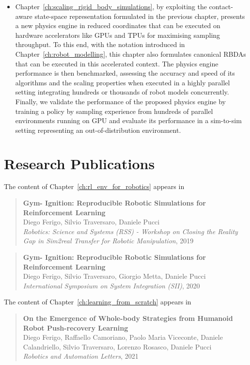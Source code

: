 \begin{itemize}
    \item Chapter~\ref{ch:scaling_rigid_body_simulations}, by exploiting the contact-aware state-space representation formulated in the previous chapter, presents a new physics engine in reduced coordinates that can be executed on hardware accelerators like \acsp{GPU} and \acsp{TPU} for maximising sampling throughput. To this end, with the notation introduced in Chapter~\ref{ch:robot_modelling}, this chapter also formulates canonical \aclp{RBDA} that can be executed in this accelerated context. The physics engine performance is then benchmarked, assessing the accuracy and speed of its algorithms and the scaling properties when executed in a highly parallel setting integrating hundreds or thousands of robot models concurrently. Finally, we validate the performance of the proposed physics engine by training a policy by sampling experience from hundreds of parallel environments running on \ac{GPU} and evaluate its performance in a sim-to-sim setting representing an out-of-distribution environment.
\end{itemize}

\section*{Research Publications}

The content of Chapter~\ref{ch:rl_env_for_robotics} appears in

\begin{quote}
    \textbf{Gym-
Ignition: Reproducible Robotic Simulations for Reinforcement
Learning} \\
    Diego Ferigo, Silvio Traversaro, Daniele Pucci \\
    \textit{Robotics: Science and Systems (RSS) - Workshop on
Closing the Reality Gap in Sim2real Transfer for Robotic Manipulation}, 2019
\end{quote}

\begin{quote}
    \textbf{Gym-
Ignition: Reproducible Robotic Simulations for Reinforcement
Learning} \\
    Diego Ferigo, Silvio Traversaro, Giorgio Metta, Daniele Pucci \\
    \textit{International Symposium on System Integration (SII)}, 2020
\end{quote}

\noindent
The content of Chapter~\ref{ch:learning_from_scratch} appears in

\begin{quote}
    \textbf{On the Emergence of Whole-body Strategies from
Humanoid Robot Push-recovery Learning} \\
    Diego Ferigo, Raffaello Camoriano, Paolo Maria Viceconte, Daniele Calandriello, Silvio Traversaro, Lorenzo Rosasco, Daniele Pucci \\
    \textit{Robotics and Automation Letters}, 2021
\end{quote}

